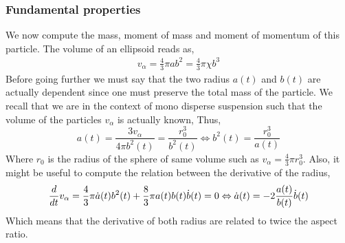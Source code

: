 \subsubsection{Fundamental properties}

We now compute the mass, moment of mass and moment of momentum of this particle. 
The volume of an ellipsoid reads as, 
\begin{align}
    v_\alpha
    = \frac{4}{3}\pi a b^2
    = \frac{4}{3}\pi \chi  b^3
    \label{eq:volume_def}
\end{align}
Before going further we must say that the two radius $a(t)$ and $b(t)$ are actually dependent since one must preserve the total mass of the particle. 
We recall that we are in the context of mono disperse suspension such that the volume of the particles $v_\alpha$ is actually known, Thus, 
\begin{equation*}
    a(t) 
    = \frac{3 v_\alpha}{4 \pi b^2(t)}
    = \frac{r_0^3}{ b^2(t)}
    \Leftrightarrow
    b^2(t) 
    = \frac{r_0^3}{ a(t)}
\end{equation*}
Where $r_0$ is the radius of the sphere of same volume such as $v_\alpha = \frac{4}{3}\pi r_0^3$. 
Also, it might be useful to compute the relation between the derivative of the radius,  
\begin{equation*}
    \frac{d}{d t} v_\alpha 
    = \frac{4}{3}\pi \dot{a}(t) b^2(t)
    + \frac{8}{3} \pi {a}(t) b(t) \dot{b}(t)
    = 0 
    \Leftrightarrow
     \dot{a}(t)
    =  
    - 2 \frac{a(t)}{b(t)}  \dot{b}(t)
\end{equation*}
Which means that the derivative of both radius are related to twice the aspect ratio. 

